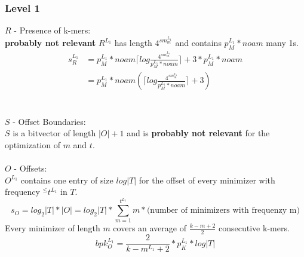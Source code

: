 \documentclass{article}
\newcommand{\noam}{noam} %
\newcommand{\levelOne}{{L_1}}
\begin{document}
\subsubsection*{Level 1}
$R$ - Presence of k-mers:\\
\textbf{probably not relevant}
$R^\levelOne$ has length $4^{sm_m^\levelOne}$ and contains $p_M^\levelOne * \noam$ many 1s.\\

\begin{align*}
	s_R^\levelOne 
	&= p_M^\levelOne * \noam \lceil log \frac{4^{sm_m^\levelOne}}{p_M^\levelOne * \noam} \rceil + 3 * p_M^\levelOne *  \noam\\
	&= p_M^\levelOne * \noam \left( \lceil log \frac{4^{sm_m^\levelOne}}{p_M^\levelOne * \noam} \rceil + 3 \right)
\end{align*}
\\
\\
$S$ - Offset Boundaries:\\
$S$ is a bitvector of length $|O| + 1$ and is \textbf{probably not relevant} for the optimization of $m$ and $t$.
\\
\\
$O$ - Offsets:\\
$O^\levelOne$ contains one entry of size $log |T|$ for the offset of every minimizer with frequency $^\leq t^\levelOne$ in $T$.\\
\[s_O = log_2|T| * |O| = log_2|T| * \sum_{m=1}^{t^\levelOne} m * \text{(number of minimizers with frequenzy m)} \]
Every minimizer of length $m$ covers an average of $\frac{k-m+2}{2}$ consecutive k-mers.\\
\[bpk_O^\levelOne = \frac{2}{k-m^\levelOne+2} * p_K^\levelOne * log |T| \]
\end{document}
